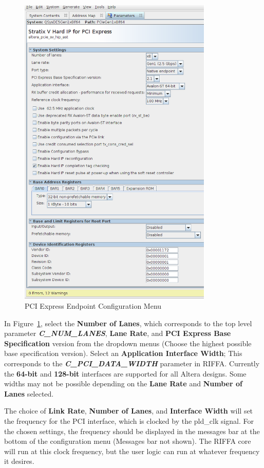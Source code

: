 \documentclass{refrep}
\newcommand{\ConfigSetting}[1]{\textbf{#1}}
\newcommand{\RIFFAParameter}[1]{\textit{\textbf{#1}}}
\begin{document}
\begin{figure}[H]
  \includegraphics[width=350px,center]{PCIExpressEndpoint1Trim.png}
  \caption{PCI Express Endpoint Configuration Menu}
  \label{Fig:Altera:QsysMegawizard:Megawizard:PCIExpressEndpoint1Trim}
\end{figure}

In Figure~\ref{Fig:Altera:QsysMegawizard:Megawizard:PCIExpressEndpoint1Trim},
select the \ConfigSetting{Number of Lanes}, which corresponds to the top level
parameter \RIFFAParameter{C\_NUM\_LANES}, \ConfigSetting{Lane Rate}, and
\ConfigSetting{PCI Express Base Specification} version from the dropdown menus
(Choose the highest possible base specification version). Select an
\ConfigSetting{Application Interface Width}; This corresponds to the
\RIFFAParameter{C\_PCI\_DATA\_WIDTH} parameter in RIFFA. Currently the
\ConfigSetting{64-bit} and \ConfigSetting{128-bit} interfaces are supported for
all Altera designs. Some widths may not be possible depending on the
\ConfigSetting{Lane Rate} and \ConfigSetting{Number of Lanes} selected.

The choice of \ConfigSetting{Link Rate}, \ConfigSetting{Number of Lanes}, and
\ConfigSetting{Interface Width} will set the frequency for the PCI interface,
which is clocked by the pld\_clk signal. For the chosen settings, the frequency
should be displayed in the messages bar at the bottom of the configuration menu
(Messages bar not shown). The RIFFA core will run at this clock frequency, but the
user logic can run at whatever frequency it desires.
\end{document}
